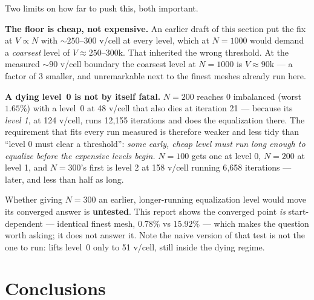\documentclass[11pt,a4paper]{article}
\begin{document}
Two limits on how far to push this, both important.

\textbf{The floor is cheap, not expensive.} An earlier draft of this section put
the fix at \(V \propto N\) with \(\sim\!250\text{--}300\) v/cell at every level,
which at \(N{=}1000\) would demand a \emph{coarsest} level of
\(V \approx 250\text{--}300\)k. That inherited the wrong threshold. At the
measured \(\sim\!90\) v/cell boundary the coarsest level at \(N{=}1000\) is
\(V \approx 90\)k --- a factor of 3 smaller, and unremarkable next to the finest
meshes already run here.

\textbf{A dying level~0 is not by itself fatal.} \(N{=}200\) reaches 0
imbalanced (worst \(1.65\%\)) with a level~0 at 48 v/cell that also dies at
iteration 21 --- because its \emph{level 1}, at 124 v/cell, runs 12{,}155
iterations and does the equalization there. The requirement that fits every run
measured is therefore weaker and less tidy than ``level 0 must clear a
threshold'': \emph{some early, cheap level must run long enough to equalize
before the expensive levels begin.} \(N{=}100\) gets one at level 0,
\(N{=}200\) at level 1, and \(N{=}300\)'s first is level 2 at 158 v/cell running
6{,}658 iterations --- later, and less than half as long.

Whether giving \(N{=}300\) an earlier, longer-running equalization level would
move its converged answer is \textbf{untested}. This report shows the converged
point \emph{is} start-dependent --- identical finest mesh, \(0.78\%\) vs
\(15.92\%\) --- which makes the question worth asking; it does not answer it.
Note the naive version of that test is not the one to run:
 lifts level~0 only to
51 v/cell, still inside the dying regime.

\section{Conclusions}
\label{sec:conclusions}
\end{document}
